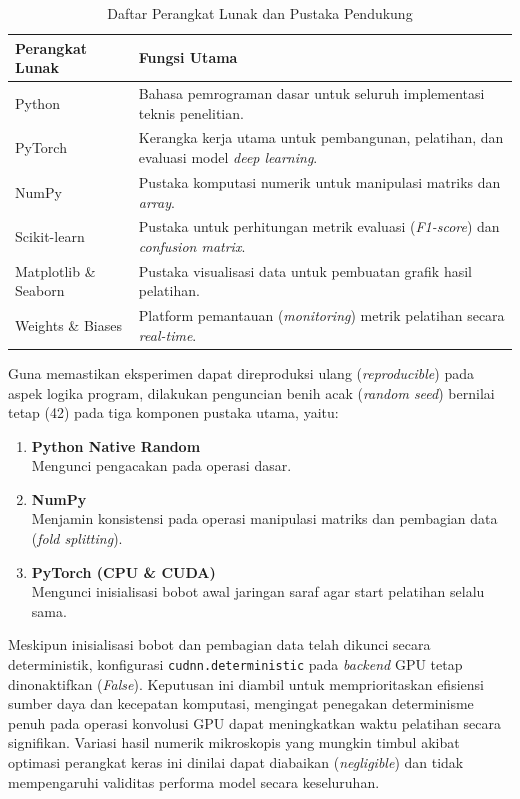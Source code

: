 \begin{table}[H]
    \centering
    \caption{Daftar Perangkat Lunak dan Pustaka Pendukung}
    \label{tab:software_spec}
    \small
    \begin{tabularx}{\textwidth}{|l|X|} 
        \hline
        \textbf{Perangkat Lunak} & \textbf{Fungsi Utama} \\ \hline
        Python & Bahasa pemrograman dasar untuk seluruh implementasi teknis penelitian. \\ \hline
        PyTorch & Kerangka kerja utama untuk pembangunan, pelatihan, dan evaluasi model \textit{deep learning}. \\ \hline
        NumPy & Pustaka komputasi numerik untuk manipulasi matriks dan \textit{array}. \\ \hline
        Scikit-learn & Pustaka untuk perhitungan metrik evaluasi (\textit{F1-score}) dan \textit{confusion matrix}. \\ \hline
        Matplotlib \& Seaborn & Pustaka visualisasi data untuk pembuatan grafik hasil pelatihan. \\ \hline
        Weights \& Biases & Platform pemantauan (\textit{monitoring}) metrik pelatihan secara \textit{real-time}. \\ \hline
    \end{tabularx}
\end{table}

Guna memastikan eksperimen dapat direproduksi ulang (\textit{reproducible}) pada aspek logika program, dilakukan penguncian benih acak (\textit{random seed}) bernilai tetap (42) pada tiga komponen pustaka utama, yaitu:
\begin{enumerate}[noitemsep]
    \item \textbf{Python Native Random} \\
    Mengunci pengacakan pada operasi dasar.
    \item \textbf{NumPy} \\
    Menjamin konsistensi pada operasi manipulasi matriks dan pembagian data (\textit{fold splitting}).
    \item \textbf{PyTorch (CPU \& CUDA)} \\
    Mengunci inisialisasi bobot awal jaringan saraf agar start pelatihan selalu sama.
\end{enumerate}

Meskipun inisialisasi bobot dan pembagian data telah dikunci secara deterministik, konfigurasi \texttt{cudnn.deterministic} pada \textit{backend} GPU tetap dinonaktifkan (\textit{False}).
Keputusan ini diambil untuk memprioritaskan efisiensi sumber daya dan kecepatan komputasi, mengingat penegakan determinisme penuh pada operasi konvolusi GPU dapat meningkatkan waktu pelatihan secara signifikan.
Variasi hasil numerik mikroskopis yang mungkin timbul akibat optimasi perangkat keras ini dinilai dapat diabaikan (\textit{negligible}) dan tidak mempengaruhi validitas performa model secara keseluruhan. \par

